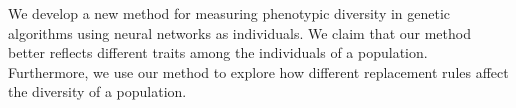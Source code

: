 We develop a new method for measuring phenotypic diversity in genetic algorithms using neural networks as individuals. We claim that our method better reflects different traits among the individuals of a population. Furthermore, we use our method to explore how different replacement rules affect the diversity of a population.


